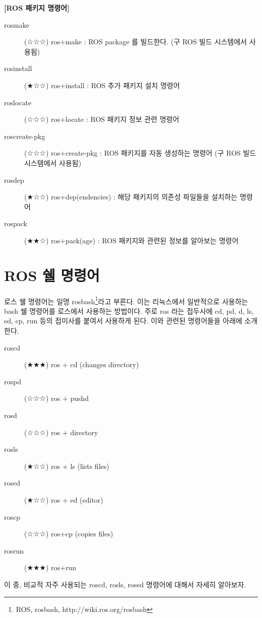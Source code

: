 \vspace{\baselineskip}
\noindent
\textbf{[ROS 패키지 명령어]}
\begin{description}
\item[rosmake] (☆☆☆) ros+make : ROS package 를 빌드한다. (구 ROS 빌드 시스템에서 사용됨)
\item[rosinstall] (★☆☆) ros+install : ROS 추가 패키지 설치 명령어
\item[roslocate] (☆☆☆) ros+locate : ROS 패키지 정보 관련 명령어 
\item[roscreate-pkg] (☆☆☆) ros+create-pkg : ROS 패키지를 자동 생성하는 명령어 (구 ROS 빌드 시스템에서 사용됨)
\item[rosdep] (★☆☆) ros+dep(endencies) : 해당 패키지의 의존성 파일들을 설치하는 명령어
\item[rospack] (★★☆) ros+pack(age) : ROS 패키지와 관련된 정보를 알아보는 명령어
\end{description}

\section{ROS 쉘 명령어}

로스 쉘 명령어는 일명 rosbash\footnote{ROS, rosbash, http://wiki.ros.org/rosbash}라고 부른다. 이는 리눅스에서 일반적으로 사용하는 bash 쉘 명령어를 로스에서 사용하는 방법이다. 주로 ros 라는 접두사에 cd, pd, d, ls, ed, cp, run 등의 접미사를 붙여서 사용하게 된다. 이와 관련된 명령어들을 아래에 소개한다.  

\vspace{\baselineskip}
\noindent
\begin{description}
\item[roscd] (★★★) ros + cd (changes directory) 
\item[rospd] (☆☆☆) ros + pushd 
\item[rosd] (☆☆☆) ros + directory
\item[rosls] (★☆☆) ros + ls (lists files)
\item[rosed] (★☆☆) ros + ed (editor)
\item[roscp] (☆☆☆) ros+cp (copies files)
\item[rosrun] (★★★) ros+run 
\end{description}

\vspace{\baselineskip}
\noindent
이 중, 비교적 자주 사용되는 roscd, rosls, rosed 명령어에 대해서 자세히 알아보자.

